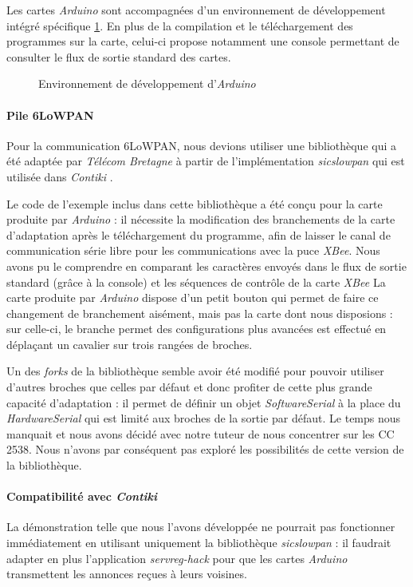Les cartes \emph{Arduino} sont accompagnées d’un environnement de développement intégré spécifique \cref{arduino-ide}.
En plus de la compilation et le téléchargement des programmes sur la carte, celui-ci propose notamment une console permettant de consulter le flux de sortie standard des cartes.

\begin{figure}[H]
\centering
{}
\caption{Environnement de développement d’\emph{Arduino}}
\label{arduino-ide}
\end{figure}

\paragraph{Pile 6LoWPAN}

Pour la communication 6LoWPAN, nous devions utiliser une bibliothèque qui a été adaptée par \emph{Télécom Bretagne} à partir de l’implémentation \emph{sicslowpan} qui est utilisée dans \emph{Contiki} .

Le code de l’exemple inclus dans cette bibliothèque a été conçu pour la carte produite par \emph{Arduino} : il nécessite la modification des branchements de la carte d’adaptation après le téléchargement du programme, afin de laisser le canal de communication série libre pour les communications avec la puce \emph{XBee}.
Nous avons pu le comprendre en comparant les caractères envoyés dans le flux de sortie standard (grâce à la console) et les séquences de contrôle de la carte \emph{XBee}
La carte produite par \emph{Arduino} dispose d’un petit bouton qui permet de faire ce changement de branchement aisément, mais pas la carte dont nous disposions : sur celle-ci, le branche permet des configurations plus avancées est effectué en déplaçant un cavalier sur trois rangées de broches.

Un des \textit{forks} de la bibliothèque  semble avoir été modifié pour pouvoir utiliser d’autres broches que celles par défaut et donc profiter de cette plus grande capacité d’adaptation : il permet de définir un objet \textit{SoftwareSerial} à la place du \textit{HardwareSerial} qui est limité aux broches de la sortie par défaut.
Le temps nous manquait et nous avons décidé avec notre tuteur de nous concentrer sur les CC 2538.
Nous n’avons par conséquent pas exploré les possibilités de cette version de la bibliothèque.

\paragraph{Compatibilité avec \emph{Contiki}}

La démonstration telle que nous l’avons développée ne pourrait pas fonctionner immédiatement en utilisant uniquement la bibliothèque \emph{sicslowpan} : il faudrait adapter en plus l’application \textit{servreg-hack} pour que les cartes \emph{Arduino} transmettent les annonces reçues à leurs voisines.
